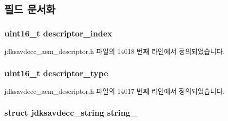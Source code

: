 \subsection{필드 문서화}
\subsubsection[{\texorpdfstring{descriptor\+\_\+index}{descriptor_index}}]{\setlength{\rightskip}{0pt plus 5cm}uint16\+\_\+t descriptor\+\_\+index}\hypertarget{structjdksavdecc__descriptor__strings_a042bbc76d835b82d27c1932431ee38d4}{}\label{structjdksavdecc__descriptor__strings_a042bbc76d835b82d27c1932431ee38d4}


jdksavdecc\+\_\+aem\+\_\+descriptor.\+h 파일의 14018 번째 라인에서 정의되었습니다.

\subsubsection[{\texorpdfstring{descriptor\+\_\+type}{descriptor_type}}]{\setlength{\rightskip}{0pt plus 5cm}uint16\+\_\+t descriptor\+\_\+type}\hypertarget{structjdksavdecc__descriptor__strings_ab7c32b6c7131c13d4ea3b7ee2f09b78d}{}\label{structjdksavdecc__descriptor__strings_ab7c32b6c7131c13d4ea3b7ee2f09b78d}


jdksavdecc\+\_\+aem\+\_\+descriptor.\+h 파일의 14017 번째 라인에서 정의되었습니다.

\subsubsection[{\texorpdfstring{string\+\_\+0}{string_0}}]{\setlength{\rightskip}{0pt plus 5cm}struct {\bf jdksavdecc\+\_\+string} string\+\_}\hypertarget{structjdksavdecc__descriptor__strings_a5dd7040ccaf4a1f44c30a7b0be194876}{}\label{structjdksavdecc__descriptor__strings_a5dd7040ccaf4a1f44c30a7b0be194876}


